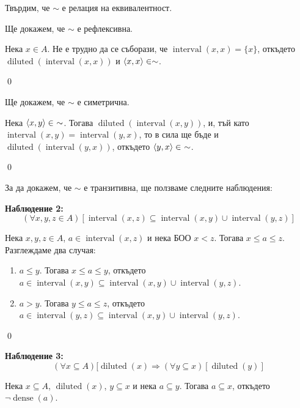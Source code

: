 \begin{problem}
\quad
Твърдим, че $\sim$ е релация на еквивалентност.

\quad
Ще докажем, че $\sim$ е рефлексивна.

\begin{tcolorbox}[mybox, title={Доказателство:}]
\quad
Нека $x \in A$. Не е трудно да се съборази, че $\operatorname{interval}(x, x) = \{x\}$,
откъдето $\operatorname{diluted}(\operatorname{interval}(x, x))$ и $\langle x, x \rangle \in \sim$.

\qed
\end{tcolorbox}

\quad
Ще докажем, че $\sim$ е симетрична.

\begin{tcolorbox}[mybox, title={Доказателство:}]
\quad
Нека $\langle x, y \rangle \in\ \sim$. Тогава $\operatorname{diluted}(\operatorname{interval}(x, y))$,
и, тъй като $\operatorname{interval}(x, y) = \operatorname{interval}(y, x)$, то в сила ще бъде и
$\operatorname{diluted}(\operatorname{interval}(y, x))$, откъдето $\langle y, x \rangle \in\ \sim$.

\qed
\end{tcolorbox}

\quad
За да докажем, че $\sim$ е транзитивна, ще ползваме следните наблюдения:

\smallbreak
\quad
\textbf{Наблюдение 2:}
\[
(\forall x, y, z \in A) [\operatorname{interval}(x, z) \subseteq \operatorname{interval}(x, y) \cup \operatorname{interval}(y, z)]
\]

\begin{tcolorbox}[mybox, title={Доказателство:}]
\quad
Нека $x, y, z \in A$, $a \in \operatorname{interval}(x, z)$ и нека БОО $x < z$. Тогава $x \le a \le z$.
Разглеждаме два случая:
\begin{enumerate}[label={\arabic* сл.}]
\item
$a \le y$. Тогава $x \le a \le y$, откъдето
$a \in \operatorname{interval}(x, y) \subseteq \operatorname{interval}(x, y) \cup \operatorname{interval}(y, z)$.

\item
$a > y$. Тогава $y \le a \le z$, откъдето
$a \in \operatorname{interval}(y, z) \subseteq \operatorname{interval}(x, y) \cup \operatorname{interval}(y, z)$.


\end{enumerate}

\qed
\end{tcolorbox}

\quad
\textbf{Наблюдение 3:}
\[
(\forall x \subseteq A) [\operatorname{diluted}(x) \Rightarrow (\forall y \subseteq x) [\operatorname{diluted}(y)]
\]
\begin{tcolorbox}[mybox, title={Доказателство:}]
\quad
Нека $x \subseteq A$, $\operatorname{diluted}(x)$, $y \subseteq x$ и нека $a \subseteq y$.
Тогава $a \subseteq x$, откъдето $\neg \operatorname{dense}(a)$.


\end{tcolorbox}
\end{problem}
